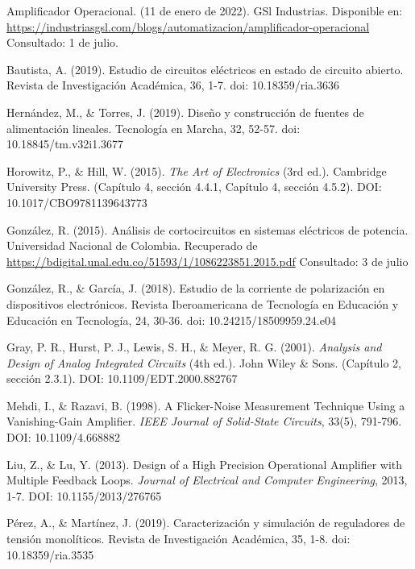 \documentclass[a4paper,12pt,spanish]{article}
\begin{document}
\begin{thebibliography}{9}

      Amplificador Operacional. (11 de enero de 2022). GSl Industrias. Disponible en: \url{https://industriasgsl.com/blogs/automatizacion/amplificador-operacional}
      Consultado: 1 de julio.
    
      Bautista, A. (2019). Estudio de circuitos eléctricos en estado de circuito abierto. Revista de Investigación Académica, 36, 1-7. doi: 10.18359/ria.3636
    
      Hernández, M., \& Torres, J. (2019). Diseño y construcción de fuentes de alimentación lineales. Tecnología en Marcha, 32, 52-57. doi: 10.18845/tm.v32i1.3677
    
      Horowitz, P., \& Hill, W. (2015). \textit{The Art of Electronics} (3rd ed.). Cambridge University Press. (Capítulo 4, sección 4.4.1, Capítulo 4, sección 4.5.2). DOI: 10.1017/CBO9781139643773
    
      González, R. (2015). Análisis de cortocircuitos en sistemas eléctricos de potencia. Universidad Nacional de Colombia. Recuperado de \url{https://bdigital.unal.edu.co/51593/1/1086223851.2015.pdf} Consultado: 3 de julio
    
      González, R., \& García, J. (2018). Estudio de la corriente de polarización en dispositivos electrónicos. Revista Iberoamericana de Tecnología en Educación y Educación en Tecnología, 24, 30-36. doi: 10.24215/18509959.24.e04
    
      Gray, P. R., Hurst, P. J., Lewis, S. H., \& Meyer, R. G. (2001). \textit{Analysis and Design of Analog Integrated Circuits} (4th ed.). John Wiley \& Sons. (Capítulo 2, sección 2.3.1). DOI: 10.1109/EDT.2000.882767
    
      Mehdi, I., \& Razavi, B. (1998). A Flicker-Noise Measurement Technique Using a Vanishing-Gain Amplifier. \textit{IEEE Journal of Solid-State Circuits}, 33(5), 791-796. DOI: 10.1109/4.668882
    
      Liu, Z., \& Lu, Y. (2013). Design of a High Precision Operational Amplifier with Multiple Feedback Loops. \textit{Journal of Electrical and Computer Engineering}, 2013, 1-7. DOI: 10.1155/2013/276765
    
      Pérez, A., \& Martínez, J. (2019). Caracterización y simulación de reguladores de tensión monolíticos. Revista de Investigación Académica, 35, 1-8. doi: 10.18359/ria.3535
    

\end{thebibliography}
\end{document}
